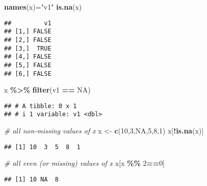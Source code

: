 \documentclass[
]{article}
\newenvironment{Shaded}{\begin{snugshade}}{\end{snugshade}}
\newcommand{\CommentTok}[1]{\textcolor[rgb]{0.56,0.35,0.01}{\textit{#1}}}
\newcommand{\ConstantTok}[1]{\textcolor[rgb]{0.56,0.35,0.01}{#1}}
\newcommand{\DecValTok}[1]{\textcolor[rgb]{0.00,0.00,0.81}{#1}}
\newcommand{\FunctionTok}[1]{\textcolor[rgb]{0.13,0.29,0.53}{\textbf{#1}}}
\newcommand{\NormalTok}[1]{#1}
\newcommand{\OtherTok}[1]{\textcolor[rgb]{0.56,0.35,0.01}{#1}}
\newcommand{\SpecialCharTok}[1]{\textcolor[rgb]{0.81,0.36,0.00}{\textbf{#1}}}
\newcommand{\StringTok}[1]{\textcolor[rgb]{0.31,0.60,0.02}{#1}}
\begin{document}
\begin{Shaded}
\begin{Highlighting}[]
\FunctionTok{names}\NormalTok{(x)}\OtherTok{=}\StringTok{"v1"}
\FunctionTok{is.na}\NormalTok{(x)}
\end{Highlighting}
\end{Shaded}

\begin{verbatim}
##         v1
## [1,] FALSE
## [2,] FALSE
## [3,]  TRUE
## [4,] FALSE
## [5,] FALSE
## [6,] FALSE
\end{verbatim}

\begin{Shaded}
\begin{Highlighting}[]
\NormalTok{x }\SpecialCharTok{\%\textgreater{}\%} \FunctionTok{filter}\NormalTok{(v1 }\SpecialCharTok{==} \ConstantTok{NA}\NormalTok{)}
\end{Highlighting}
\end{Shaded}

\begin{verbatim}
## # A tibble: 0 x 1
## # i 1 variable: v1 <dbl>
\end{verbatim}

\begin{Shaded}
\begin{Highlighting}[]
\CommentTok{\# all non{-}missing values of x}
\NormalTok{x }\OtherTok{\textless{}{-}} \FunctionTok{c}\NormalTok{(}\DecValTok{10}\NormalTok{,}\DecValTok{3}\NormalTok{,}\ConstantTok{NA}\NormalTok{,}\DecValTok{5}\NormalTok{,}\DecValTok{8}\NormalTok{,}\DecValTok{1}\NormalTok{)}
\NormalTok{x[}\SpecialCharTok{!}\FunctionTok{is.na}\NormalTok{(x)]}
\end{Highlighting}
\end{Shaded}

\begin{verbatim}
## [1] 10  3  5  8  1
\end{verbatim}

\begin{Shaded}
\begin{Highlighting}[]
\CommentTok{\# all even (or missing) values of x}
\NormalTok{x[x }\SpecialCharTok{\%\%} \DecValTok{2}\SpecialCharTok{==}\DecValTok{0}\NormalTok{]}
\end{Highlighting}
\end{Shaded}

\begin{verbatim}
## [1] 10 NA  8
\end{verbatim}
\end{document}
